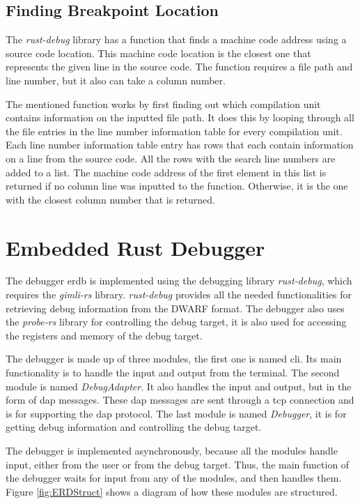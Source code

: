 \subsection{Finding Breakpoint Location}
The \emph{rust-debug} library has a function that finds a machine code address using a source code location.
This machine code location is the closest one that represents the given line in the source code.
The function requires a file path and line number, but it also can take a column number.


The mentioned function works by first finding out which compilation unit contains information on the inputted file path.
It does this by looping through all the file entries in the line number information table for every compilation unit.
Each line number information table entry has rows that each contain information on a line from the source code.
All the rows with the search line numbers are added to a list.
The machine code address of the first element in this list is returned if no column line was inputted to the function.
Otherwise, it is the one with the closest column number that is returned.




\section{Embedded Rust Debugger}
The debugger \acrfull{erdb} is implemented using the debugging library \emph{rust-debug}, which requires the \emph{gimli-rs} library.
\emph{rust-debug} provides all the needed functionalities for retrieving debug information from the \gls{DWARF} format.
The debugger also uses the \emph{probe-rs} library for controlling the debug target, it is also used for accessing the registers and memory of the debug target.


The debugger is made up of three modules, the first one is named \acrshort{cli}.
Its main functionality is to handle the input and output from the terminal.
The second module is named \emph{DebugAdapter}.
It also handles the input and output, but in the form of \gls{dap} messages.
These \gls{dap} messages are sent through a \acrshort{tcp} connection and is for supporting the \gls{dap} protocol.
The last module is named \emph{Debugger}, it is for getting debug information and controlling the debug target.



The debugger is implemented asynchronously, because all the modules handle input, either from the user or from the debug target.
Thus, the main function of the debugger waits for input from any of the modules, and then handles them.
Figure \ref{fig:ERDStruct} shows a diagram of how these modules are structured.


